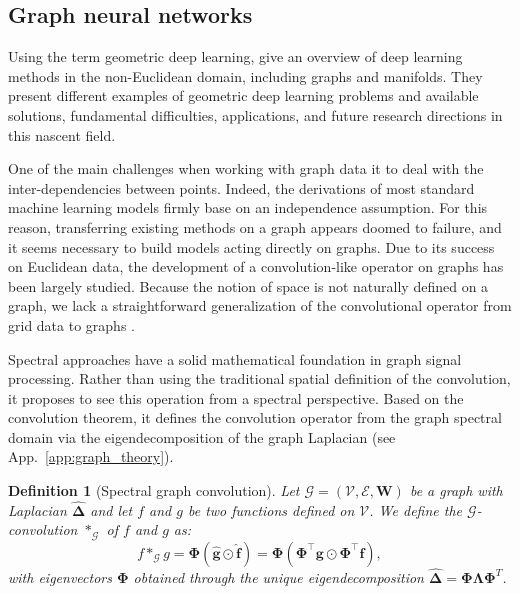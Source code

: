 \documentclass{article}
\newtheorem{definition}{Definition}[section]
\begin{document}
\subsection{Graph neural networks} \label{sec:graph_neural_networks}

Using the term geometric deep learning, \citet{bronstein2017geometric,bronstein2021geometric} give an overview of deep learning methods in the non-Euclidean domain, including graphs and manifolds. They present different examples of geometric deep learning problems and available solutions, fundamental difficulties, applications, and future research directions in this nascent field.

One of the main challenges when working with graph data it to deal with the inter-dependencies between points. Indeed, the derivations of most standard machine learning models firmly base on an independence assumption. For this reason, transferring existing methods on a graph appears doomed to failure, and it seems necessary to build models acting directly on graphs. Due to its success on Euclidean data, the development of a convolution-like operator on graphs has been largely studied. Because the notion of space is not naturally defined on a graph, we lack a straightforward generalization of the convolutional operator from grid data to graphs \citep{scarselli2008graph, bruna2013spectral, henaff2015deep, defferrard2016chebnet, kipf2016gcn, masci2015geodesic, boscaini2016learning, monti2017geometric}.

Spectral approaches have a solid mathematical foundation in graph signal processing. Rather than using the traditional spatial definition of the convolution, it proposes to see this operation from a spectral perspective. Based on the convolution theorem, it defines the convolution operator from the graph spectral domain via the eigendecomposition of the graph Laplacian (see App.~\ref{app:graph_theory}).

\begin{definition}[Spectral graph convolution]
Let $\mathcal{G} = (\mathcal{V}, \mathcal{E}, \boldsymbol{W})$ be a graph with Laplacian $\boldsymbol{\hat{\Delta}}$ and let $f$ and $g$ be two functions defined on $\mathcal{V}$. We define the $\mathcal{G}$-convolution $*_{\mathcal{G}}$ of $f$ and $g$ as:
\begin{equation}
f *_{\mathcal{G}} g = \boldsymbol{\Phi} (\boldsymbol{\hat{g}} \odot \boldsymbol{\hat{f}}) = \boldsymbol{\Phi} (\boldsymbol{\Phi}^{\top} \boldsymbol{g} \odot \boldsymbol{\Phi}^{\top} \boldsymbol{f}),
\end{equation}
with eigenvectors $\boldsymbol{\Phi}$ obtained through the unique eigendecomposition $\boldsymbol{\hat{\Delta}} = \boldsymbol{\Phi} \boldsymbol{\Lambda} \boldsymbol{\Phi}^T$.
\end{definition}
\end{document}
